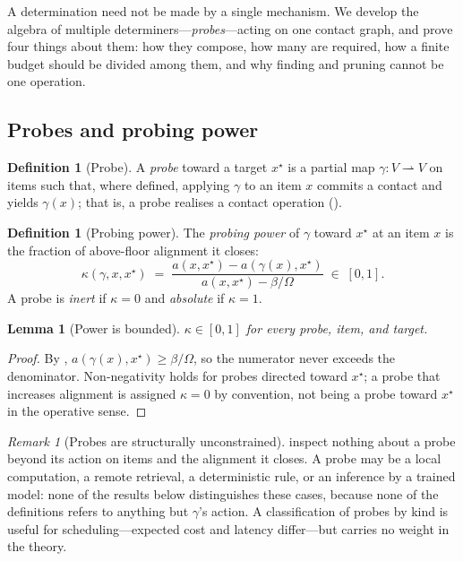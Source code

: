 \documentclass[11pt,twocolumn,a4paper]{article}
\theoremstyle{dirthm}
\newtheorem{lemma}[theorem]{Lemma}
\theoremstyle{definition}
\newtheorem{definition}[theorem]{Definition}
\theoremstyle{remark}
\newtheorem{remark}[theorem]{Remark}
\newcommand{\V}{V}
\newcommand{\flo}{\beta}
\newcommand{\al}{a}
\newcommand{\Om}{\Omega}
\newcommand{\pot}{\kappa}
\begin{document}
A determination need not be made by a single mechanism. We develop the
algebra of multiple determiners---\emph{probes}---acting on one contact
graph, and prove four things about them: how they compose, how many are
required, how a finite budget should be divided among them, and why finding
and pruning cannot be one operation.

\subsection{Probes and probing power}

\begin{definition}[Probe]
\label{def:probe}
A \emph{probe} toward a target $x^{\star}$ is a partial map
$\gamma\colon\V\rightharpoonup\V$ on items such that, where defined,
applying $\gamma$ to an item $x$ commits a contact and yields $\gamma(x)$;
that is, a probe realises a contact operation ().
\end{definition}

\begin{definition}[Probing power]
\label{def:power}
The \emph{probing power} of $\gamma$ toward $x^{\star}$ at an item $x$ is the
fraction of above-floor alignment it closes:
\[
\pot(\gamma,x,x^{\star})\;=\;
\frac{\al(x,x^{\star})-\al(\gamma(x),x^{\star})}
     {\al(x,x^{\star})-\flo/\Om}\;\in\;[0,1].
\]
A probe is \emph{inert} if $\pot=0$ and \emph{absolute} if $\pot=1$.
\end{definition}

\begin{lemma}[Power is bounded]
\label{lem:power-bound}
$\pot\in[0,1]$ for every probe, item, and target.
\end{lemma}

\begin{proof}
By , $\al(\gamma(x),x^{\star})\ge\flo/\Om$, so the
numerator never exceeds the denominator. Non-negativity holds for probes
directed toward $x^{\star}$; a probe that increases alignment is assigned
$\pot=0$ by convention, not being a probe toward $x^{\star}$ in the operative
sense.
\end{proof}

\begin{remark}[Probes are structurally unconstrained]
\label{rem:probe-neutral}
 inspect nothing about a probe beyond its action on
items and the alignment it closes. A probe may be a local computation, a
remote retrieval, a deterministic rule, or an inference by a trained model:
none of the results below distinguishes these cases, because none of the
definitions refers to anything but $\gamma$'s action. A classification of
probes by kind is useful for scheduling---expected cost and latency
differ---but carries no weight in the theory.
\end{remark}
\end{document}

